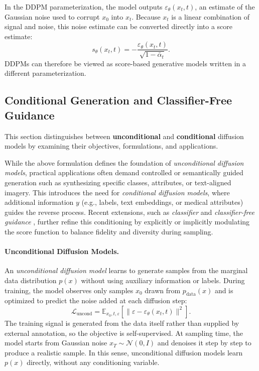 In the DDPM parameterization, the model outputs \(\varepsilon_\theta(x_t,t)\), an estimate
of the Gaussian noise used to corrupt \(x_0\) into \(x_t\). Because \(x_t\) is a linear
combination of signal and noise, this noise estimate can be converted directly into a score
estimate:
\begin{equation}
    s_\theta(x_t, t) = -\frac{\varepsilon_\theta(x_t, t)}{\sqrt{1-\bar\alpha_t}}.
    \label{eq:score_noise}
\end{equation}
DDPMs can therefore be viewed as score-based generative models written in a different
parameterization. 


\subsection{Conditional Generation and Classifier-Free Guidance}

This section distinguishes between \textbf{unconditional} and \textbf{conditional} diffusion models by examining their objectives, formulations, and applications.

While the above formulation defines the foundation of \emph{unconditional diffusion models}, practical applications often demand controlled or semantically guided generation such as synthesizing specific classes, attributes, or text-aligned imagery.
This introduces the need for \emph{conditional diffusion models}, where additional information \(y\) (e.g., labels, text embeddings, or medical attributes) guides the reverse process.
Recent extensions, such as \emph{classifier} \citep{NEURIPS2021_49ad23d1} and \emph{classifier-free guidance} \citep{ho2022classifier}, further refine this conditioning by explicitly or implicitly modulating the score function to balance fidelity and diversity during sampling.

\paragraph{Unconditional Diffusion Models.}
An \textit{unconditional diffusion model} learns to generate samples from the marginal data distribution \(p(x)\) without using auxiliary information or labels. During training, the model observes only samples \(x_0\) drawn from \(p_{\text{data}}(x)\) and is optimized to predict the noise added at each diffusion step:
\begin{equation}
\mathcal{L}_{\text{uncond}} = \mathbb{E}_{x_0, t, \varepsilon}\!\left[\|\varepsilon - \varepsilon_\theta(x_t, t)\|^2\right].
\end{equation}
The training signal is generated from the data itself rather than supplied by external annotation, so the objective is self-supervised. At sampling time, the model starts from Gaussian noise \(x_T \sim \mathcal{N}(0, I)\) and denoises it step by step to produce a realistic sample. In this sense, unconditional diffusion models learn \(p(x)\) directly, without any conditioning variable.

